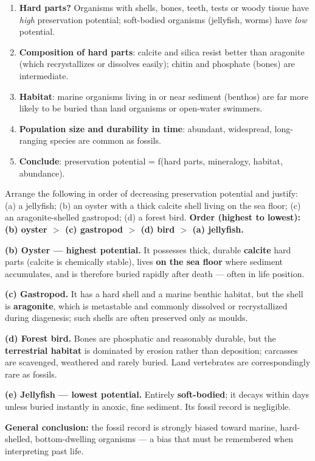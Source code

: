\documentclass[11pt]{article}
\begin{document}
\begin{methode}
\begin{enumerate}
\item \textbf{Hard parts?} Organisms with shells, bones, teeth, tests or woody tissue have \emph{high} preservation potential; soft-bodied organisms (jellyfish, worms) have \emph{low} potential.
\item \textbf{Composition of hard parts}: calcite and silica resist better than aragonite (which recrystallizes or dissolves easily); chitin and phosphate (bones) are intermediate.
\item \textbf{Habitat}: marine organisms living in or near sediment (benthos) are far more likely to be buried than land organisms or open-water swimmers.
\item \textbf{Population size and durability in time}: abundant, widespread, long-ranging species are common as fossils.
\item \textbf{Conclude}: preservation potential = f(hard parts, mineralogy, habitat, abundance).
\end{enumerate}
\end{methode}

\begin{exoresolu}
Arrange the following in order of decreasing preservation potential and justify: (a) a jellyfish; (b) an oyster with a thick calcite shell living on the sea floor; (c) an aragonite-shelled gastropod; (d) a forest bird.
\tcblower
\textbf{Order (highest to lowest): (b) oyster $>$ (c) gastropod $>$ (d) bird $>$ (a) jellyfish.}

\textbf{(b) Oyster — highest potential.} It possesses thick, durable \textbf{calcite} hard parts (calcite is chemically stable), lives \textbf{on the sea floor} where sediment accumulates, and is therefore buried rapidly after death — often in life position.

\textbf{(c) Gastropod.} It has a hard shell and a marine benthic habitat, but the shell is \textbf{aragonite}, which is metastable and commonly dissolved or recrystallized during diagenesis; such shells are often preserved only as moulds.

\textbf{(d) Forest bird.} Bones are phosphatic and reasonably durable, but the \textbf{terrestrial habitat} is dominated by erosion rather than deposition; carcasses are scavenged, weathered and rarely buried. Land vertebrates are correspondingly rare as fossils.

\textbf{(e) Jellyfish — lowest potential.} Entirely \textbf{soft-bodied}; it decays within days unless buried instantly in anoxic, fine sediment. Its fossil record is negligible.

\textbf{General conclusion:} the fossil record is strongly biased toward marine, hard-shelled, bottom-dwelling organisms — a bias that must be remembered when interpreting past life.
\end{exoresolu}
\end{document}
